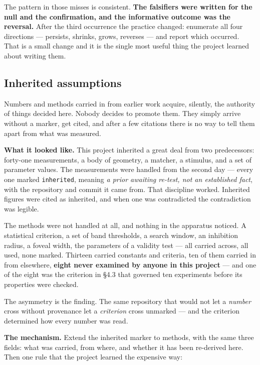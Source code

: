 The pattern in those misses is consistent. \textbf{The falsifiers were written for the null and the confirmation, and the informative outcome was the reversal.} After the third occurrence the practice changed: enumerate all four directions --- persists, shrinks, grows, reverses --- and report which occurred. That is a small change and it is the single most useful thing the project learned about writing them.

\subsection{Inherited assumptions}

Numbers and methods carried in from earlier work acquire, silently, the authority of things decided here. Nobody decides to promote them. They simply arrive without a marker, get cited, and after a few citations there is no way to tell them apart from what was measured.

\textbf{What it looked like.} This project inherited a great deal from two predecessors: forty-one measurements, a body of geometry, a matcher, a stimulus, and a set of parameter values. The measurements were handled from the second day --- every one marked \texttt{inherited}, meaning \textit{a prior awaiting re-test, not an established fact}, with the repository and commit it came from. That discipline worked. Inherited figures were cited as inherited, and when one was contradicted the contradiction was legible.

The methods were not handled at all, and nothing in the apparatus noticed. A statistical criterion, a set of band thresholds, a search window, an inhibition radius, a foveal width, the parameters of a validity test --- all carried across, all used, none marked. Thirteen carried constants and criteria, ten of them carried in from elsewhere, \textbf{eight never examined by anyone in this project} --- and one of the eight was the criterion in \S4.3 that governed ten experiments before its properties were checked.

The asymmetry is the finding. The same repository that would not let a \textit{number} cross without provenance let a \textit{criterion} cross unmarked --- and the criterion determined how every number was read.

\textbf{The mechanism.} Extend the inherited marker to methods, with the same three fields: what was carried, from where, and whether it has been re-derived here. Then one rule that the project learned the expensive way:

